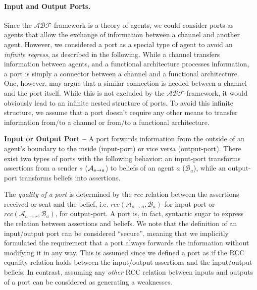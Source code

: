 \documentclass[runningheads]{llncs}
\newcommand{\assertionRegion}{\mathcal{A}}
\newcommand{\beliefRegion}{\mathcal{B}}
\newcommand{\factRegion}{\mathcal{F}}
\newcommand{\rcc}{rcc}
\newcommand{\abftheory}{\assertionRegion\beliefRegion\factRegion}
\newcommand{\Rcc}[2]{rcc(#1,#2)}
\newcommand{\rassert}[3]{\mathcal{A}_{#1\rightarrow #2}#3}
\begin{document}
\paragraph{Input and Output Ports.}
Since the $\abftheory$-framework is a theory of agents, we could consider ports as
agents that allow the exchange of information between a channel and another
agent.  However, we considered a port as a special type of agent to avoid
an \emph{infinite regress}, as described in the following. While a channel transfers information between agents, and
a functional architecture processes information, a port is simply a connector between
a channel and a functional architecture. One, however, may argue that a similar
connection is needed between a channel and the port itself. While this is not 
excluded by the $\abftheory$-framework, it would obviously lead to an infinite
nested structure of ports. To avoid this infinite structure, we assume
that a port doesn't require any other means to transfer information from/to a channel
or from/to a functional architecture. 

\begin{definition}{\bf Input or Output Port --}\label{def:port} 
	A port forwards information from the outside of an agent's boundary to
	the inside (input-port) or vice versa (output-port).  There exist two
	types of ports with the following behavior: an input-port 
	transforms assertions from a sender $s$ ($\rassert{s}{a}$) to beliefs
	of an agent $a$ ($\beliefRegion_a$), while an output-port transforms beliefs
	into assertions.
\end{definition}
The \emph{quality of a port} is determined by the $\rcc$ relation between the
assertions received or sent and the belief, i.e.
$\Rcc{\rassert{s}{a}}{\beliefRegion_a}$ for input-port or
$\Rcc{\rassert{a}{r}}{\beliefRegion_a}$, for output-port.  A port is, in
fact, syntactic sugar to express the relation between assertions and beliefs.
We note that the definition of an input/output port can
be considered ``secure'', meaning that we implicitly formulated the requirement
that a port always forwards the information without modifying it in any way.
This is assumed since we defined a port as if the RCC equality relation holds
between the input/output assertions and the input/output beliefs. In contrast,
assuming any \emph{other} RCC relation between inputs and outputs of a port can be considered as generating a weaknesses.
\end{document}

